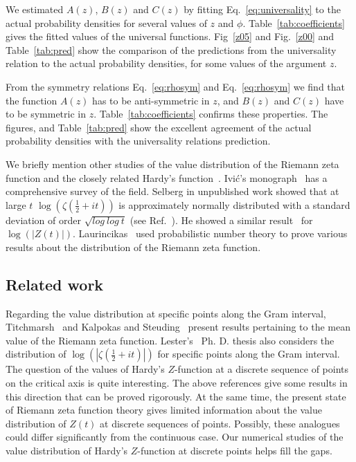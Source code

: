 \documentclass[twoside]{article}
\begin{document}
We estimated $A(z)$, $B(z)$ and $C(z)$ by fitting Eq.~\ref{eq:universality} to the actual
probability densities for several values of $z$ and $\phi$. Table~\ref{tab:coefficients} gives the 
fitted values 
of the universal functions.
Fig~\ref{z05} and Fig.~\ref{z00} and Table~\ref{tab:pred} show the comparison of the predictions 
from the universality 
relation to the actual probability densities, for some values of the argument $z$.

From the symmetry relations Eq.~\ref{eq:rhosym} and Eq.~\ref{eq:rhosym} we find 
that the function 
$A(z)$ has to be anti-symmetric in $z$, and $B(z)$ and $C(z)$ have to be symmetric in $z$.
Table~\ref{tab:coefficients} confirms these properties. The figures, and 
Table~\ref{tab:pred} show the excellent agreement of the actual probability densities with the
universality relations prediction.

We briefly mention other studies of the value distribution of the Riemann zeta function and 
the closely related Hardy's function~\cite{Hardy 1918}.  Ivi\'c's monograph~\cite{Ivic 2013} has a comprehensive survey of  the field.
Selberg in unpublished work showed that at large $t$ $\log (\zeta(\frac{1}{2} + it))$ is approximately normally distributed with a standard deviation of order $\sqrt{log~log~t}$ (see Ref.~\cite{Hejhal}). He showed a 
similar result~\cite{Selberg 1989, Selberg 1991} for $\log (|Z(t)|)$. Laurincikas~\cite{Laurincikas}  used probabilistic number theory to prove various results about the distribution of the Riemann zeta function.

\subsection{\label{related}Related work}

Regarding the value distribution at specific points along the Gram interval, 
Titchmarsh~\cite{Titchmarsh 1934} and Kalpokas and Steuding~\cite{kalpokas 2009} present 
results pertaining to the
mean value of the Riemann zeta function. Lester's~\cite{Lester 2013} Ph. D. thesis also 
considers the distribution of $\log (|\zeta(\frac{1}{2} + it)|)$  for specific points along the Gram interval.  
The question of the values of Hardy's $Z$-function at a discrete sequence of points on the critical axis 
is quite interesting. The above references give some results in this direction that can be proved rigorously. 
At the same time, the present state of Riemann zeta function theory gives limited information 
about the value distribution of $Z(t)$ at discrete sequences of points. Possibly, these analogues 
could differ significantly from the continuous case.  
Our numerical studies of the value distribution of Hardy's $Z$-function at discrete points
helps fill the gaps. 
\end{document}
